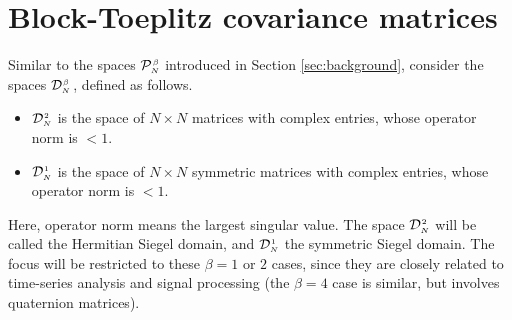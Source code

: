 \documentclass[draftclsnofoot]{IEEEtran}
\begin{document}
\section{Block-Toeplitz covariance matrices} \label{sec:siegel}
Similar to the spaces $\mathcal{P}^{\hspace{0.02cm}\scriptscriptstyle \beta}_{\scriptscriptstyle N}$ introduced in Section \ref{sec:background}, consider the spaces $\mathcal{D}^{\hspace{0.02cm}\scriptscriptstyle \beta}_{\scriptscriptstyle N\hspace{0.03cm}}$, defined as follows.
\begin{itemize}
    \item $\mathcal{D}^{\hspace{0.02cm}\scriptscriptstyle 2}_{\scriptscriptstyle N}$ is the space of $N \times N$ matrices with complex entries, whose operator norm is $< 1$.
    \item $\mathcal{D}^{\hspace{0.02cm}\scriptscriptstyle 1}_{\scriptscriptstyle N}$ is the space of $N \times N$ symmetric matrices with complex entries, whose operator norm is $< 1$.
\end{itemize}
Here, operator norm means the largest singular value. The space $\mathcal{D}^{\hspace{0.02cm}\scriptscriptstyle 2}_{\scriptscriptstyle N}$
will be called the Hermitian Siegel domain, and $\mathcal{D}^{\hspace{0.02cm}\scriptscriptstyle 1}_{\scriptscriptstyle N}$ the symmetric Siegel domain. The focus will be restricted to these $\beta = 1$ or $2$ cases, since they are closely related to time-series analysis and signal processing (the $\beta = 4$ case is similar, but involves quaternion matrices). 
\end{document}
